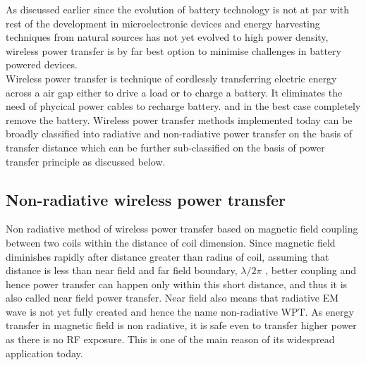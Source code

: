 \documentclass[UKenglish]{ifimaster}  %
\begin{document}
As discussed earlier since the evolution of battery technology is not at par with rest of the development in 
microelectronic devices and energy harvesting techniques from natural sources has not yet evolved to high power
density, wireless power transfer is by far best option to minimise challenges in battery powered devices. \\

Wireless power transfer is technique of cordlessly transferring electric energy across a air gap either to drive 
a load or to charge a battery. It eliminates the need of phycical power cables to recharge battery. and in the 
best case completely remove the battery. Wireless power transfer methods implemented today can be broadly 
classified into radiative and non-radiative power transfer on the basis of transfer distance which can be further 
sub-classified on the basis of power transfer principle \cite{wpt_fund_std} as discussed below.\\


\subsection{Non-radiative wireless power transfer}

Non radiative method of wireless power transfer based on magnetic field coupling between two coils within the distance of coil dimension. Since magnetic field diminishes rapidly after distance greater than radius of coil, assuming that distance is less than near field and far field boundary, $\lambda /2\pi$  \cite[pp. 63]{rfid_2010}, better coupling and hence power transfer can happen only within this short distance, and thus it is also called near field power transfer. Near field also means that radiative EM wave is not yet fully created and hence the name non-radiative WPT. As energy transfer in magnetic field is non radiative, it is safe even to transfer higher power as there is no RF exposure. This is one of the main reason of its widespread application today. \\
\end{document}
